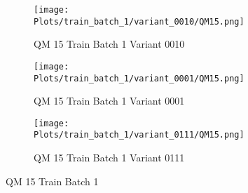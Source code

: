 \documentclass{DissertateFigs}
\begin{document}
\begin{figure}[t!]
\medskip

    \begin{subfigure}{0.32\textwidth}
    \texttt{[image: Plots/train\_batch\_1/variant\_0010/QM15.png]}
    \caption{QM 15 Train Batch 1 Variant 0010}
    \end{subfigure}
    \begin{subfigure}{0.32\textwidth}
    \texttt{[image: Plots/train\_batch\_1/variant\_0001/QM15.png]}
    \caption{QM 15 Train Batch 1 Variant 0001}
    \end{subfigure}

\medskip

    \begin{subfigure}{0.32\textwidth}
    \texttt{[image: Plots/train\_batch\_1/variant\_0111/QM15.png]}
    \caption{QM 15 Train Batch 1 Variant 0111}
    \end{subfigure}
\caption{QM 15 Train Batch 1}
    \end{figure}
\clearpage
\end{document}
